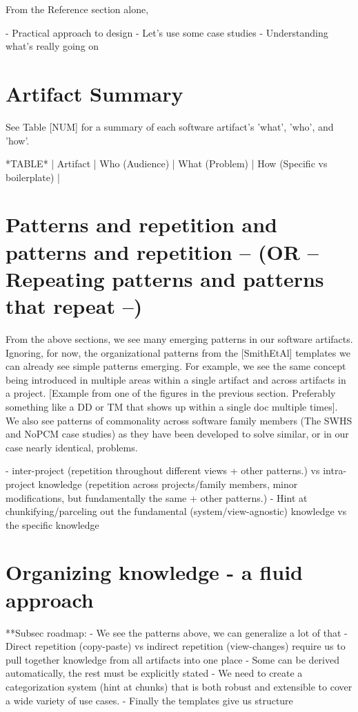 From the Reference section alone, 


- Practical approach to design
- Let's use some case studies
- Understanding what's really going on

\section{Artifact Summary}

See Table [NUM] for a summary of each software artifact's 'what', 'who', and
'how'.

*TABLE*
| Artifact | Who (Audience) | What (Problem) | How (Specific vs boilerplate) |

\section{Patterns and repetition and patterns and repetition -- (OR -- Repeating patterns and patterns that repeat --)}
From the above sections, we see many emerging patterns in our software
artifacts. Ignoring, for now, the organizational patterns from the [SmithEtAl]
templates we can already see simple patterns emerging. For example, we see the
same concept being introduced in multiple areas within a single artifact and
across artifacts in a project. [Example from one of the figures in the previous
section. Preferably something like a DD or TM that shows up within a single doc
multiple times]. We also see patterns of commonality across software family
members (The SWHS and NoPCM case studies) as they have been developed to solve
similar, or in our case nearly identical, problems.

- inter-project (repetition throughout different views + other patterns.)
  vs intra-project knowledge (repetition across projects/family members,
  minor modifications, but fundamentally the same + other patterns.)
- Hint at chunkifying/parceling out the fundamental (system/view-agnostic)
knowledge vs the specific knowledge

\section{Organizing knowledge - a fluid approach}
  **Subsec roadmap:
    - We see the patterns above, we can generalize a lot of that
    - Direct repetition (copy-paste) vs indirect repetition (view-changes)
    require us to pull together knowledge from all artifacts into one place
    - Some can be derived automatically, the rest must be explicitly stated
    - We need to create a categorization system (hint at chunks) that is both
    robust and extensible to cover a wide variety of use cases.
    - Finally the templates give us structure

